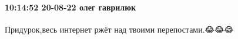  
 
 
 
 

\paragraph{10:14:52 20-08-22 олег гаврилюк}

Придурок,весь интернет ржёт над твоими перепостами.😂😂😂
